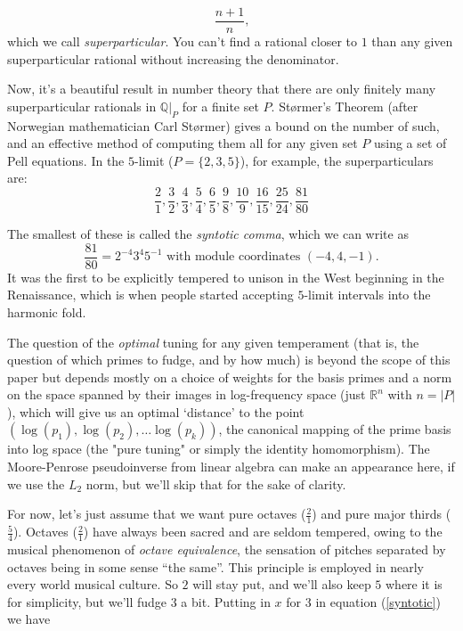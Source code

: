 \documentclass[12pt]{article}
\newcommand{\RR}{\mathbb{R}}      %
\newcommand{\QQ}{\mathbb{Q}}      %
\begin{document}
\[\frac{n+1}{n}\text{,}\]
which we call \emph{superparticular}.  You can't find a rational closer to $1$ than any given superparticular rational without increasing the denominator.\\
\par
Now, it's a beautiful result in number theory that there are only finitely many superparticular rationals in $\QQ |_P$ for a finite set $P$.  St\o{}rmer's Theorem (after Norwegian mathematician Carl St\o{}rmer) gives a bound on the number of such, and an effective method of computing them all for any given set $P$ using a set of Pell equations.  In the $5$-limit ($P=\{2,3,5\}$), for example, the superparticulars are:
\[\frac{2}{1},\frac{3}{2},\frac{4}{3},\frac{5}{4},\frac{6}{5},\frac{9}{8},\frac{10}{9},\frac{16}{15},\frac{25}{24},\frac{81}{80}\]
\par
The smallest of these is called the \emph{syntotic comma}, which we can write as
\begin{equation}
\frac{81}{80}=2^{-4}3^4 5^{-1}\text{ with module coordinates $(-4,4,-1)$.}\label{syntotic}
\end{equation}
It was the first to be explicitly tempered to unison in the West beginning in the Renaissance, which is when people started accepting $5$-limit intervals into the harmonic fold.\\
\par
The question of the \emph{optimal} tuning for any given temperament (that is, the question of which primes to fudge, and by how much) is beyond the scope of this paper but depends mostly on a choice of weights for the basis primes and a norm on the space spanned by their images in log-frequency space (just $\RR^n$ with $n=|P|$), which will give us an optimal `distance' to the point $(\log(p_1),\log(p_2),\ldots\log(p_k))$, the canonical mapping of the prime basis into log space (the "pure tuning" or simply the identity homomorphism).  The Moore-Penrose pseudoinverse from linear algebra can make an appearance here, if we use the $L_2$ norm, but we'll skip that for the sake of clarity.\\
\par
For now, let's just assume that we want pure octaves ($\tfrac{2}{1}$) and pure major thirds ($\tfrac{5}{4}$).  Octaves ($\frac{2}{1}$) have always been sacred and are seldom tempered, owing to the musical phenomenon of \emph{octave equivalence}, the sensation of pitches separated by octaves being in some sense ``the same''.  This principle is employed in nearly every world musical culture.  So $2$ will stay put, and we'll also keep $5$ where it is for simplicity, but we'll fudge $3$ a bit.  Putting in $x$ for $3$ in equation (\ref{syntotic}) we have
\end{document}
